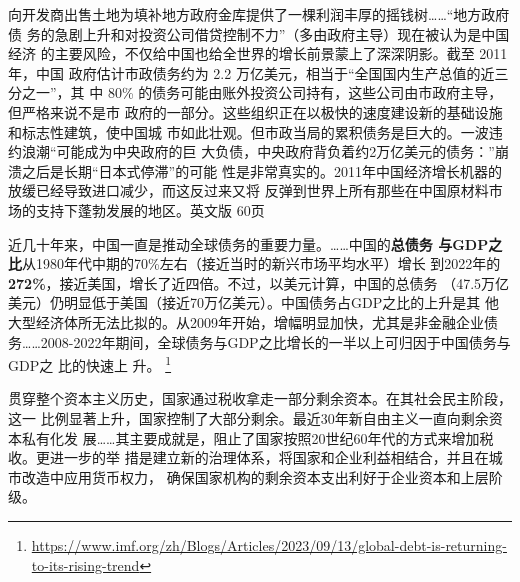 向开发商出售土地为填补地方政府金库提供了一棵利润丰厚的摇钱树……“地方政府债
务的急剧上升和对投资公司借贷控制不力”（多由政府主导）现在被认为是中国经济
的主要风险，不仅给中国也给全世界的增长前景蒙上了深深阴影。截至 2011 年，中国
政府估计市政债务约为 2.2 万亿美元，相当于“全国国内生产总值的近三分之一”，其
中 80\% 的债务可能由账外投资公司持有，这些公司由市政府主导，但严格来说不是市
政府的一部分。这些组织正在以极快的速度建设新的基础设施和标志性建筑，使中国城
市如此壮观。但市政当局的累积债务是巨大的。一波违约浪潮“可能成为中央政府的巨
大负债，中央政府背负着约2万亿美元的债务：”崩溃之后是长期“日本式停滞”的可能
性是非常真实的。2011年中国经济增长机器的放缓已经导致进口减少，而这反过来又将
反弹到世界上所有那些在中国原材料市场的支持下蓬勃发展的地区。英文版 60页




近几十年来，中国一直是推动全球债务的重要力量。……中国的\textbf{总债务
  与GDP之比}从1980年代中期的70\%左右（接近当时的新兴市场平均水平）增长
到2022年的\textbf{272\%}，接近美国，增长了近四倍。不过，以美元计算，中国的总债务
（47.5万亿美元）仍明显低于美国（接近70万亿美元）。中国债务占GDP之比的上升是其
他大型经济体所无法比拟的。从2009年开始，增幅明显加快，尤其是非金融企业债
务……2008-2022年期间，全球债务与GDP之比增长的一半以上可归因于中国债务与GDP之
比的快速上
升。
\footnote{\url{https://www.imf.org/zh/Blogs/Articles/2023/09/13/global-debt-is-returning-to-its-rising-trend}}

贯穿整个资本主义历史，国家通过税收拿走一部分剩余资本。在其社会民主阶段，这一
比例显著上升，国家控制了大部分剩余。最近30年新自由主义一直向剩余资本私有化发
展……其主要成就是，阻止了国家按照20世纪60年代的方式来增加税收。更进一步的举
措是建立新的治理体系，将国家和企业利益相结合，并且在城市改造中应用货币权力，
确保国家机构的剩余资本支出利好于企业资本和上层阶级。



